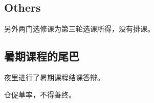 \documentclass[
]{article}
\begin{document}
\hypertarget{header-n51}{%
\subsection{Others}\label{header-n51}}

另外两门选修课为第三轮选课所得，没有排课。

\hypertarget{header-n53}{%
\subsection{暑期课程的尾巴}\label{header-n53}}

夜里进行了暑期课程结课答辩。

仓促草率，不得善终。
\end{document}
